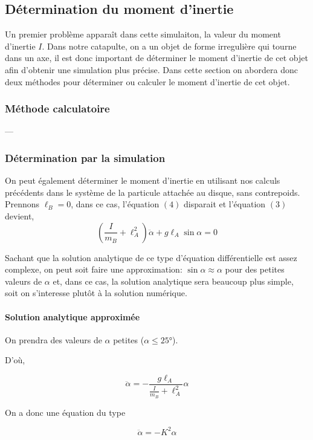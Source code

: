\documentclass[10pt]{article}
\begin{document}
\pagebreak
\subsection{Détermination du moment d'inertie}

Un premier problème apparaît dans cette simulaiton, la valeur du moment d'inertie $I$. Dans notre catapulte, on a un objet
de forme irregulière qui tourne dans un axe, il est donc important de déterminer le moment d'inertie de cet objet afin d'obtenir
une simulation plus précise. Dans cette section on abordera donc deux méthodes pour déterminer ou calculer le moment d'inertie
de cet objet.

\subsubsection{Méthode calculatoire}
---

\subsubsection{Détermination par la simulation}

On peut également déterminer le moment d'inertie en utilisant nos calculs précédents dans le système de la particule attachée
au disque, sans contrepoids. Prennons $\ell_B = 0$, dans ce cas, l'équation $(4)$ disparait et l'équation $(3)$ devient,
\begin{equation}
\left(\frac{I}{m_B}+\ell_A^2\right)\ddot{\alpha}+g\ell_A\sin{\alpha} = 0
\end{equation}

Sachant que la solution analytique de ce type d'équation différentielle est assez complexe, on peut soit faire une approximation:
$\sin{\alpha} \approx \alpha$ pour des petites valeurs de $\alpha$ et, dans ce cas, la solution analytique sera beaucoup plus simple,
soit on s'interesse plutôt à la solution numérique. 

\paragraph{Solution analytique approximée}


On prendra des valeurs de $\alpha$ petites ($\alpha \leq 25$°).

D'où,

$$
\ddot{\alpha} = -\frac{g\ell_A}{\frac{I}{m_B}+\ell_A^2}\alpha
$$

On a donc une équation du type

$$
\ddot{\alpha} = -K^2\alpha
$$
\end{document}
